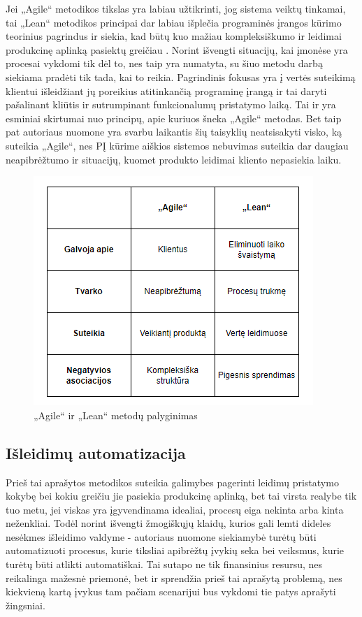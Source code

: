 \documentclass{VUMIFPSkursinis}
\begin{document}
Jei „Agile“ metodikos tikslas yra labiau užtikrinti, jog sistema veiktų tinkamai, tai „Lean“ metodikos principai dar labiau išplečia programinės įrangos kūrimo teorinius pagrindus ir siekia, kad būtų kuo mažiau kompleksiškumo ir leidimai produkcinę aplinką pasiektų greičiau \cite{SaltSestas}. Norint išvengti situacijų, kai įmonėse yra procesai vykdomi tik dėl to, nes taip yra numatyta, su šiuo metodu darbą siekiama pradėti tik tada, kai to reikia. Pagrindinis fokusas yra į vertės suteikimą klientui išleidžiant jų poreikius atitinkančią programinę įrangą ir tai daryti pašalinant kliūtis ir sutrumpinant funkcionalumų pristatymo laiką. Tai ir yra esminiai skirtumai nuo principų, apie kuriuos šneka „Agile“ metodas. Bet taip pat autoriaus nuomone yra svarbu laikantis šių taisyklių neatsisakyti visko, ką suteikia „Agile“, nes PĮ kūrime aiškios sistemos nebuvimas suteikia dar daugiau neapibrėžtumo ir situacijų, kuomet produkto leidimai kliento nepasiekia laiku.

\begin{figure}[H]
    \centering
    \includegraphics[scale=0.8]{img/AgileVSLean.png}
    \caption{„Agile“ ir „Lean“ metodų palyginimas}
    \label{img:mlp}
\end{figure}

\subsection{Išleidimų automatizacija}

Prieš tai aprašytos metodikos suteikia galimybes pagerinti leidimų pristatymo kokybę bei kokiu greičiu jie pasiekia produkcinę aplinką, bet tai virsta realybe tik tuo metu, jei viskas yra įgyvendinama idealiai, procesų eiga nekinta arba kinta neženkliai. Todėl norint išvengti žmogiškųjų klaidų, kurios gali lemti dideles nesėkmes išleidimo valdyme - autoriaus nuomone siekiamybė turėtų būti automatizuoti procesus, kurie tiksliai apibrėžtų įvykių seka bei veiksmus, kurie turėtų būti atlikti automatiškai. Tai sutapo ne tik finansinius resursu, nes reikalinga mažesnė priemonė, bet ir sprendžia prieš tai aprašytą problemą, nes kiekvieną kartą įvykus tam pačiam scenarijui bus vykdomi tie patys aprašyti žingsniai.
\end{document}

